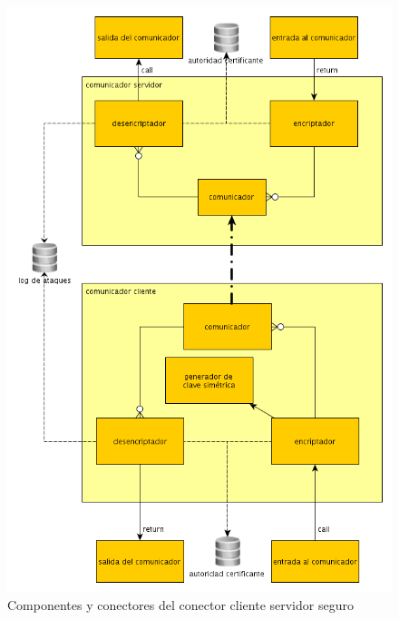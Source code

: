 \begin{figure}[H]
	\begin{center}
		\includegraphics[scale=0.5]{../informe/imagenes/comunicador.png}
	\end{center} 
	\caption{Componentes y conectores del conector cliente servidor seguro}	
	\label{fig:Conector}
\end{figure}

